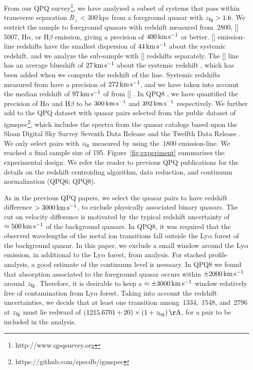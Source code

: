 \documentclass[iop]{emulateapj}
\begin{document}
From our QPQ survey\footnote{http://www.qpqsurvey.org}, we have analyzed a subset of systems that 
pass within transverse separation $R_\perp<300$\,kpc from a foreground quasar with 
$z_{\rm fg} > 1.6$. We restrict the sample to foreground quasars with redshift measured from 
\,2800, []\,5007, H$\alpha$, or H$\beta$ emission, giving a precision of 
$400\,{\rm km\,s^{-1}}$ or better. 
[] emission-line redshifts have the smallest dispersion of $44\,{\rm km\,s^{-1}}$ about 
the systemic redshift, and we analyze the sub-sample with [] redshifts separately. 
The [] line has an average blueshift of $27\,{\rm km\,s^{-1}}$ about the systemic 
redshift \citep{Boroson05}, which has been added when we compute the 
redshift of the line. Systemic redshifts measured from  have a precision of 
$272\,{\rm km\,s^{-1}}$, and we have taken into account the median redshift of 
$97\,{\rm km\,s^{-1}}$ of  from [] \citep{Richards+02}. In QPQ8 
\citep{QPQ8}, we have quantified the precision of H$\alpha$ and H$\beta$ to be 
$300\,{\rm km\,s^{-1}}$ and $392\,{\rm km\,s^{-1}}$ respectively. We further add to the QPQ 
dataset with quasar pairs selected from the public dataset of 
igmspec\footnote{https://github.com/specdb/igmspec}, which includes the spectra from the quasar 
catalogs based upon the Sloan Digital Sky Survey Seventh Data Release \citep{Schneider+10} and the 
Twelfth Data Release \citep{Paris+17}. We 
only select pairs with $z_{\rm fg}$ measured by \cite{HewettWild10} using the \,1800 
emission-line. We reached a final sample size of 195. Figure~\ref{fig:experiment} summarizes the 
experimental design. We refer the reader to previous QPQ publications for the details on the 
redshift centroiding algorithm, data reduction, and continuum normalization (QPQ6; QPQ8). 

As in the previous QPQ papers, we select the quasar pairs to have redshift difference 
$>3000\,{\rm km\,s^{-1}}$, to exclude physically associated binary quasars. The cut on velocity 
difference is motivated by the typical redshift uncertainty of $\approx500\,{\rm km\,s^{-1}}$ of 
the background quasars. In QPQ8, it was required that the observed wavelengths of the 
metal ion transitions fall outside the Ly$\alpha$ forest of the background quasar. In this paper, 
we exclude a small window around the Ly$\alpha$ emission, in additional to the Ly$\alpha$ forest, 
from analysis. For stacked profile analysis, a good estimate of 
the continuum level is neessary. In QPQ8 we found that absorption associated to 
the foreground quasar occurs within $\pm2000\,{\rm km\,s^{-1}}$ around $z_{\rm fg}$. Therefore, it 
is desirable to keep a $\approx\pm3000\,{\rm km\,s^{-1}}$ window relatively free of contamination 
from Ly$\alpha$ forest. Taking into account the redshift uncertainties, 
we decide that at least one transition among \,1334, \,1548, and 
\,2796 at $z_{\rm fg}$ must lie redward of 
$(1215.6701+20)\times(1+z_{\rm bg})\,{\rm \AA}$, for a pair to be included in the analysis. 
\end{document}
